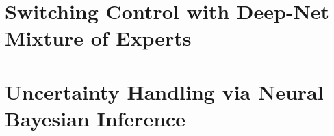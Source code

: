 \documentclass[12pt]{report}
\begin{document}

\begintext


\chapter{Switching Control with Deep-Net Mixture of Experts}




\chapter{Uncertainty Handling via Neural Bayesian Inference}






{} 



{}
\appendix

\end{document}
